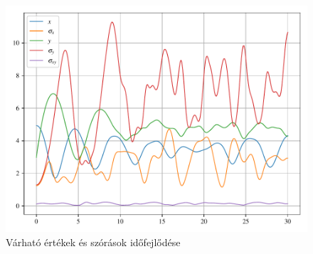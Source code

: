 \begin{figure}[H]
	\includegraphics[scale=1]{./figs/expectations.pdf}
	\caption{Várható értékek és szórások időfejlődése}
\end{figure}
